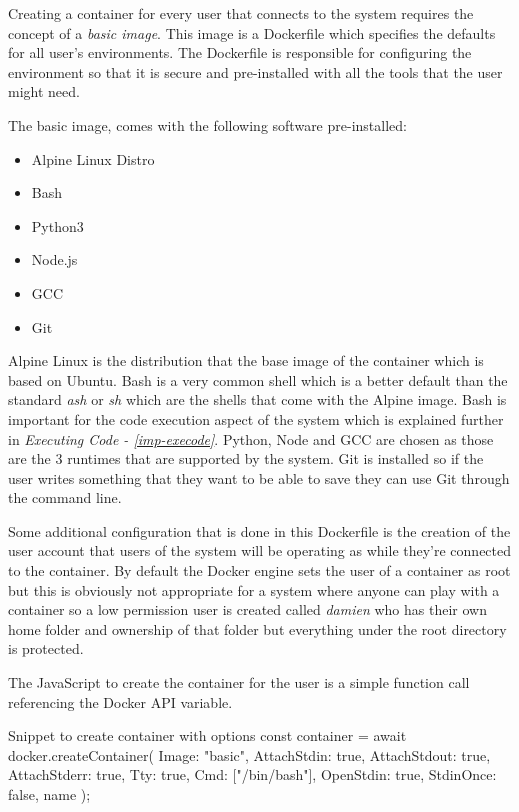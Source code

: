 Creating a container for every user that connects to the system requires the concept of a \textit{basic image}. This image is a Dockerfile which specifies the defaults for all user's environments. The Dockerfile is responsible for configuring the environment so that it is secure and pre-installed with all the tools that the user might need.

The basic image, comes with the following software pre-installed: 

\begin{itemize}
    \item Alpine Linux Distro
    \item Bash
    \item Python3
    \item Node.js
    \item GCC
    \item Git
\end{itemize}

Alpine Linux is the distribution that the base image of the container which is based on Ubuntu. Bash is a very common shell which is a better default than the standard \textit{ash} or \textit{sh} which are the shells that come with the Alpine image. Bash is important for the code execution aspect of the system which is explained further in \textit{Executing Code - \ref{imp-execode}}. Python, Node and GCC are chosen as those are the 3 runtimes that are supported by the system. Git is installed so if the user writes something that they want to be able to save they can use Git through the command line.

Some additional configuration that is done in this Dockerfile is the creation of the user account that users of the system will be operating as while they're connected to the container. By default the Docker engine sets the user of a container as root but this is obviously not appropriate for a system where anyone can play with a container so a low permission user is created called \textit{damien} who has their own home folder and ownership of that folder but everything under the root directory is protected.

The JavaScript to create the container for the user is a simple function call referencing the Docker API variable.

\begin{sexylisting}{Snippet to create container with options}
const container = await docker.createContainer({
    Image: "basic",
    AttachStdin: true,
    AttachStdout: true,
    AttachStderr: true,
    Tty: true,
    Cmd: ["/bin/bash"],
    OpenStdin: true,
    StdinOnce: false,
    name
});
\end{sexylisting}

